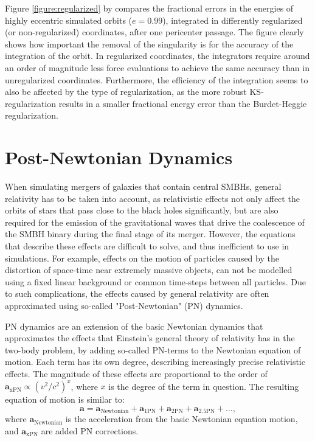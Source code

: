 \documentclass[english, oneside]{HYgradu}
\begin{document}
Figure \ref{figure:regularized} by \cite{BinneyTremaine} compares the fractional errors in the energies of highly eccentric simulated orbits ($e = 0.99$), integrated in differently regularized (or non-regularized) coordinates, after one pericenter passage. The figure clearly shows how important the removal of the singularity is for the accuracy of the integration of the orbit. In regularized coordinates, the integrators require around an order of magnitude less force evaluations to achieve the same accuracy than in unregularized coordinates. Furthermore, the efficiency of the integration seems to also be affected by the type of regularization, as the more robust KS-regularization results in a smaller fractional energy error than the Burdet-Heggie regularization.

\section{Post-Newtonian Dynamics} \label{section:PN}

When simulating mergers of galaxies that contain central SMBHs, general relativity has to be taken into account, as relativistic effects not only affect the orbits of stars that pass close to the black holes significantly, but are also required for the emission of the gravitational waves that drive the coalescence of the SMBH binary during the final stage of its merger. However, the equations that describe these effects are difficult to solve, and thus inefficient to use in simulations. For example, effects on the motion of particles caused by the distortion of space-time near extremely massive objects, can not be modelled using a fixed linear background or common time-steps between all particles. Due to such complications, the effects caused by general relativity are often approximated using so-called "Post-Newtonian" (PN) dynamics.

PN dynamics are an extension of the basic Newtonian dynamics that approximates the effects that Einstein's general theory of relativity has in the two-body problem, by adding so-called PN-terms to the Newtonian equation of motion. Each term has its own degree, describing increasingly precise relativistic effects. The magnitude of these effects are proportional to the order of $\mathbf{a}_\mathrm{xPN} \propto \left( v^2 / c^2 \right)^x$, where $x$ is the degree of the term in question. The resulting equation of motion is similar to:
\begin{equation}
\mathbf{a} = \mathbf{a}_\mathrm{Newtonian} + \mathbf{a}_\mathrm{1PN} + \mathbf{a}_\mathrm{2PN} + \mathbf{a}_\mathrm{2.5PN} + \ldots, \label{eq:PN_eom}
\end{equation}
where $\mathbf{a}_\mathrm{Newtonian}$ is the acceleration from the basic Newtonian equation motion, and $\mathbf{a}_\mathrm{xPN}$ are added PN corrections.
\end{document}
